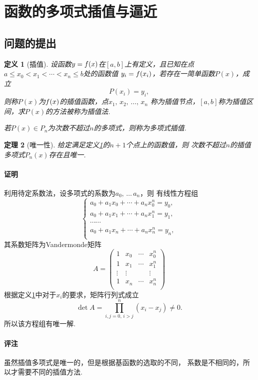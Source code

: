 \documentclass[12pt, a4paper]{article}
\theoremstyle{margin}
\newtheorem{thm}{定理}
\newtheorem{defi}[thm]{定义}
\newcommand{\f}{\mathnormal{f}}
\newcommand\defref[1]{定义\ref{#1}}
\newcommand{\remark}{\paragraph{评注}}
\newcommand{\proof}{\paragraph{证明}}
\begin{document}
\newpage
\section{函数的多项式插值与逼近}
\subsection{问题的提出}
  \begin{defi}[插值]
    \label{defi: 插值}
    设函数$y = \f(x)$在$[a, b]$上有定义，且已知在点
    $a\le x_0 < x_1 < \cdots < x_n \le b$处的函数值
    $y_i = \f(x_i)$，若存在一简单函数$P(x)$，成立
    \[
      P(x_i) = y_i,
    \]
    则称$P(x)$为$\f(x)$的插值函数，点$x_1,\,x_2,\,\dots,\,x_n$
    称为插值节点，$[a, b]$称为插值区间，求$P(x)$的方法被称为插值法. \par
    若$P(x) \in P_n$为次数不超过$n$的多项式，则称为多项式插值.
  \end{defi}

  \begin{thm}[唯一性]
    给定满足\defref{defi: 插值}的$n+1$个点上的函数值，则
    次数不超过$n$的插值多项式$P_n(x)$存在且唯一.
  \end{thm}
  \proof
    利用待定系数法，设多项式的系数为$a_0,\,\dots\,a_n$，则
    有线性方程组
    \[
      \left\{
      \begin{gathered}
          a_0 + a_1x_0 + \cdots + a_nx_0^n = y_0,\\
          a_0 + a_1x_1 + \cdots + a_nx_1^n = y_1,\\
          \cdots\cdots \\
          a_0 + a_1x_n + \cdots + a_nx_n^n = y_n,\\
      \end{gathered}
      \right.
    \]
    其系数矩阵为Vandermonde矩阵
    \[
      A =
      \begin{pmatrix}
        1 & x_0 & \cdots & x_0^n \\
        1 & x_1 & \cdots & x_1^n \\
        \vdots & \vdots & & \vdots \\
        1 & x_n & \cdots & x_n^n \\
      \end{pmatrix}
    \]
    根据\defref{defi: 插值}中对于$x_i$的要求，矩阵行列式成立
    \[
      \det A = \prod_{i,j=0,\,i>j}^n (x_i - x_j) \ne 0.
    \]
    所以该方程组有唯一解.
  \remark
    虽然插值多项式是唯一的，但是根据基函数的选取的不同，
    系数是不相同的，所以才需要不同的插值方法.
\end{document}
